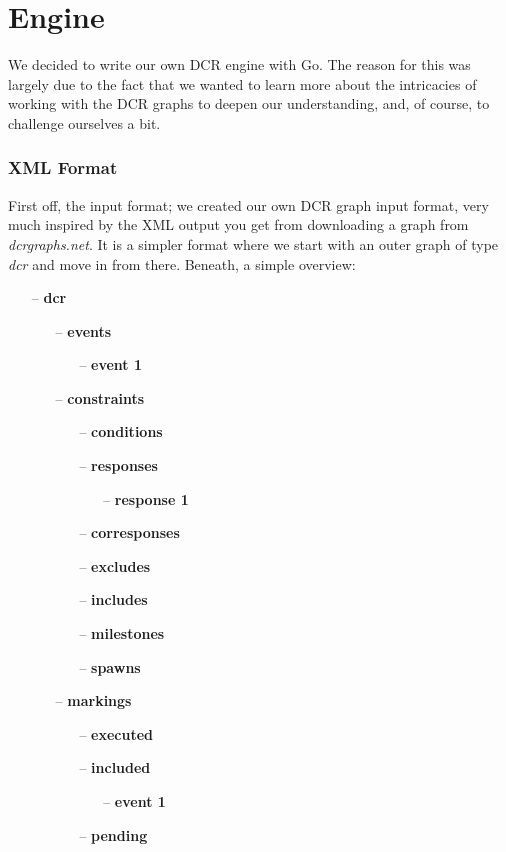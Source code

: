 \section*{Engine}
We decided to write our own DCR engine with Go. The reason for this was largely due to the fact
that we wanted to learn more about the intricacies of working with the DCR graphs to deepen our
understanding, and, of course, to challenge ourselves a bit.

\subsubsection*{XML Format}
First off, the input format; we created our own DCR graph input format, very much inspired by the
XML output you get from downloading a graph from \textit{dcrgraphs.net}. 
It is a simpler format where we start with an outer graph of type \textit{dcr} and move in from
there. Beneath, a simple overview:

\begin{itemize}
    \item[--] \textbf{dcr} 
    \begin{itemize}
        \item[--] \textbf{events} 
        \begin{itemize}
            \item[--] \textbf{event 1} 
        \end{itemize}	
        \item[--] \textbf{constraints} 
        \begin{itemize}
            \item[--] \textbf{conditions} 
            \item[--] \textbf{responses} 
            \begin{itemize}
                \item[--] \textbf{response 1} 
            \end{itemize}	
            \item[--] \textbf{corresponses} 
            \item[--] \textbf{excludes} 
            \item[--] \textbf{includes} 
            \item[--] \textbf{milestones} 
            \item[--] \textbf{spawns} 
        \end{itemize}	
        \item[--] \textbf{markings} 
        \begin{itemize}
            \item[--] \textbf{executed} 
            \item[--] \textbf{included} 
            \begin{itemize}
                \item[--] \textbf{event 1} 
            \end{itemize}	
            \item[--] \textbf{pending} 
        \end{itemize}	
    \end{itemize}	
\end{itemize}	

